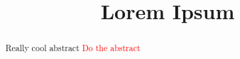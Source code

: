 \documentclass[sigplan,nonacm]{acmart}
\newcommand{\fixme}[1]{\textcolor{red}{#1}}
\begin{document}
\title{Lorem Ipsum}

\begin{abstract}
    Really cool abstract \fixme{Do the abstract}
\end{abstract}
\maketitle %







\end{document}
